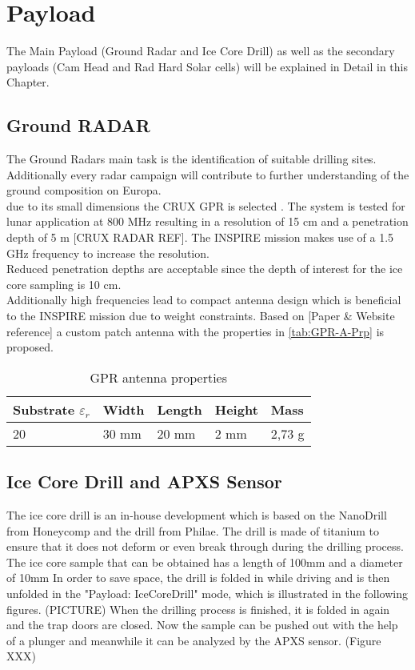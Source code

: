 
\chapter{Payload}
\label{chap:payload}

The Main Payload (Ground Radar and Ice Core Drill) as well as the secondary payloads (Cam Head and Rad Hard Solar cells) will be explained in Detail in this Chapter.

\section{Ground RADAR}
The Ground Radars main task is the identification of suitable drilling sites. Additionally every radar campaign will contribute to further understanding of the ground composition on Europa.\\

due to its small dimensions the CRUX GPR is selected . The system is tested for lunar application at 800 MHz resulting in a resolution of 15 cm and a penetration depth of 5 m [CRUX RADAR REF]. The INSPIRE mission makes use of a 1.5 GHz frequency to increase the resolution. \\
Reduced penetration depths are acceptable since the depth of interest for the ice core sampling is 10 cm. \\

Additionally high frequencies lead to compact antenna design which is beneficial to the INSPIRE mission due to weight constraints. 
Based on [Paper \& Website reference] a custom patch antenna with the properties in \autoref{tab:GPR-A-Prp} is proposed.

\begin{table}[h]
\centering
\begin{tabular}{lllll}
Substrate ${\varepsilon}_{r}$ & Width & Length & Height & Mass   \\ \hline\hline
20                         & 30 mm & 20 mm  & 2 mm   & 2,73 g  \\ \hline
\end{tabular}
\caption{GPR antenna properties}
\label{tab:GPR-A-Prp}
\end{table}

\section{Ice Core Drill and APXS Sensor}

The ice core drill is an in-house development which is based on the NanoDrill from Honeycomp and the drill from Philae. The drill is made of titanium to ensure that it does not deform or even break through during the drilling process.
The ice core sample that can be obtained has a length of 100mm and a diameter of 10mm
In order to save space, the drill is folded in while driving and is then unfolded in the "Payload: IceCoreDrill" mode, which is illustrated in the following figures. (PICTURE)
When the drilling process is finished, it is folded in again and the trap doors are closed.
Now the sample can be pushed out with the help of a plunger and meanwhile it can be analyzed by the APXS sensor. (Figure XXX)


